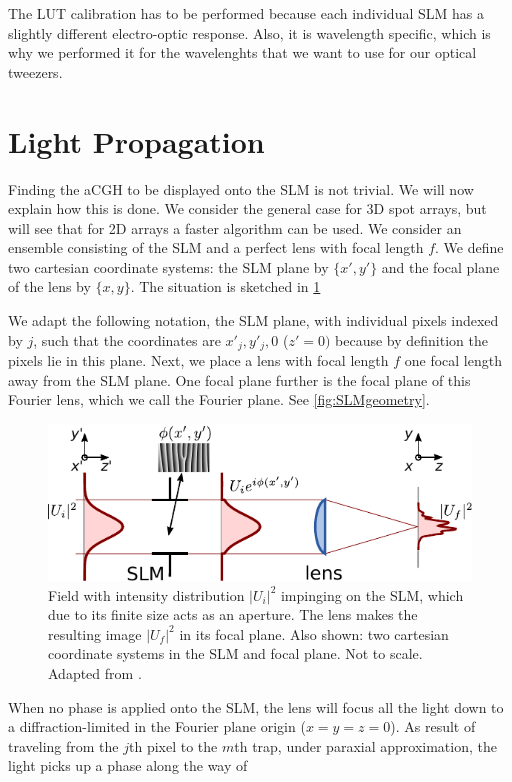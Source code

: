 The LUT calibration has to be performed because each individual SLM has a slightly different electro-optic response. Also, it is wavelength specific, which is why we performed it for the wavelenghts that we want to use for our optical tweezers. 

\section{Light Propagation}\label{sec:PropagationDerivation}

Finding the a\ac{CGH} to be displayed onto the SLM is not trivial. We will now explain how this is done. We consider the general case for 3D spot arrays, but will see that for 2D arrays a faster algorithm can be used. We consider an ensemble consisting of the SLM and a perfect lens with focal length $f$. We define two cartesian coordinate systems: the SLM plane by $\{x',y'\}$ and the focal plane of the lens by $\{x,y\}$. The situation is sketched in \cref{fig:SLMLens}

We adapt the following notation, the \ac{SLM} plane, with individual pixels indexed by $j$, such that the coordinates are $x'_j, y'_j,0$ ($z'=0)$ because by definition the pixels lie in this plane. Next, we place a lens with focal length $f$ one focal length away from the SLM plane. One focal plane further is the focal plane of this Fourier lens, which we call the Fourier plane. See \cref{fig:SLMgeometry}. 

\begin{figure}
    \centering
    \includegraphics[width = 12cm]{figures/SLMfigure.pdf}
    \caption{Field with intensity distribution $|U_i|^2$ impinging on the SLM, which due to its finite size acts as an aperture. The lens makes the resulting image $|U_f|^2$ in its focal plane. Also shown: two cartesian coordinate systems in the SLM and focal plane. Not to scale. Adapted from \cite{Labuhn2016}.}
    \label{fig:SLMLens}
\end{figure}

When no phase is applied onto the SLM, the lens will focus all the light down to a diffraction-limited in the Fourier plane origin ($x=y=z=0$). As result of traveling from the $j$th pixel to the $m$th trap, under paraxial approximation, the light picks up a phase along the way of 

